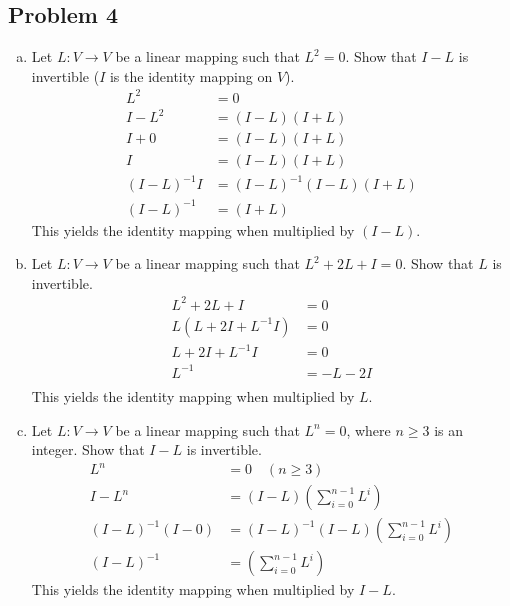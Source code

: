 \documentclass{math}
\begin{document}
\subsection*{Problem 4}
\begin{enumerate}[(a)]
  \item Let \( L:V\to V \) be a linear mapping such that \( L^2 = 0 \). Show
  that \( I-L \) is invertible (\( I \) is the identity mapping on \( V \)).
  \begin{align*}
    L^2 &= 0 \\
    I-L^2 &= (I-L)(I+L) \\
    I+0 &= (I-L)(I+L) \\
    I &= (I-L)(I+L) \\
    (I-L)^{-1}I &= (I-L)^{-1}(I-L)(I+L) \\
    (I-L)^{-1} &= (I+L)
  \end{align*}
  This yields the identity mapping when multiplied by \( (I-L) \).
  \item Let \( L:V\to V \) be a linear mapping such that \( L^2+2L+I = 0 \).
  Show that \( L \) is invertible.
  \begin{align*}
    L^2+2L+I &= 0 \\
    L(L+2I+L^{-1}I) &= 0 \\
    L+2I+L^{-1}I &= 0 \\
    L^{-1} &= -L-2I \\
  \end{align*}
  This yields the identity mapping when multiplied by \( L \).
  \item Let \( L:V\to V \) be a linear mapping such that \( L^n = 0 \), where
  \( n\ge3 \) is an integer. Show that \( I-L \) is invertible.
  \begin{align*}
    L^n &= 0 \quad (n\ge3) \\
    I-L^n &= (I-L)\left(\sum_{i=0}^{n-1}L^i\right) \\
    (I-L)^{-1}(I-0) &= (I-L)^{-1}(I-L)\left(\sum_{i=0}^{n-1}L^i\right) \\
    (I-L)^{-1} &= \left(\sum_{i=0}^{n-1}L^i\right)
  \end{align*}
  This yields the identity mapping when multiplied by \( I-L \).
\end{enumerate}
\end{document}
